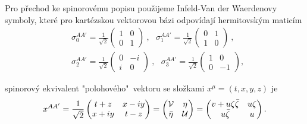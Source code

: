 Pro přechod ke spinorovému popisu použijeme Infeld-Van der Waerdenovy symboly, které pro kartézskou
vektorovou bázi odpovídají hermitovským maticím
\begin{equation}
    \label{eq:infeld-van-der-waerden}
    \begin{split}
        &\sigma_0^{AA'}=\frac{1}{\sqrt{2}}\left(\begin{matrix}
            1 & 0 \\
            0 & 1
        \end{matrix}\right)~,~~~ \sigma_1^{AA'}=\frac{1}{\sqrt{2}}\left(\begin{matrix}
            0 & 1 \\
            1 & 0
        \end{matrix}\right)~,\\
        &\sigma_2^{AA'}=\frac{1}{\sqrt{2}}\left(\begin{matrix}
            0 & -i \\
            i & 0
        \end{matrix}\right)~,~~~ \sigma_3^{AA'}=\frac{1}{\sqrt{2}}\left(\begin{matrix}
            1 & 0 \\
            0 & -1
        \end{matrix}\right),
    \end{split}
\end{equation}

spinorový ekvivalent "polohového"\ vektoru se složkami $x^\mu = (t, x, y, z)$ je
\begin{equation}
    \label{eq:spinor_vektor}
    x^{AA'} = \frac{1}{\sqrt{2}} \begin{pmatrix}
        t + z & x - iy \\
        x + iy & t - z
    \end{pmatrix} = \begin{pmatrix}
        \mathcal{V} & \eta \\
        \bar{\eta} & \mathcal{U}
    \end{pmatrix} = \begin{pmatrix}
        v + u \zeta \bar{\zeta} & u \zeta \\
        u \bar{\zeta} & u
    \end{pmatrix}.
\end{equation}

